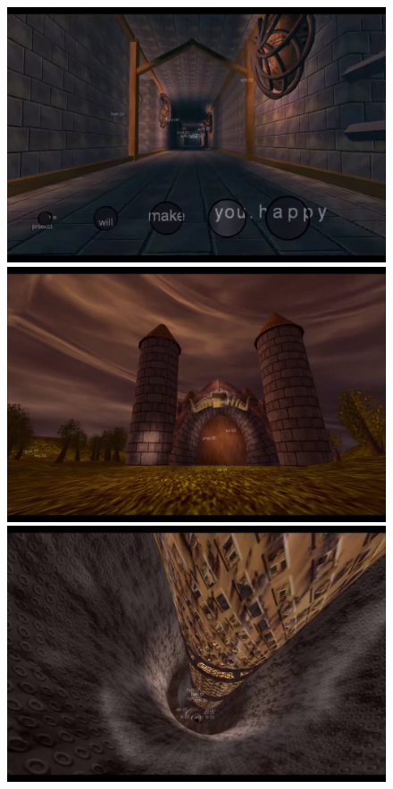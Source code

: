 \begin{figure}[h]
  \begin{minipage}[b]{0.30\linewidth}
    \centering
    \includegraphics[width=\linewidth]{images/demoscene/demos/farb1.png}
  \end{minipage}
  \hfill
  \begin{minipage}[b]{0.30\linewidth}
    \centering
    \includegraphics[width=\linewidth]{images/demoscene/demos/farb2.png}
  \end{minipage}
  \hfill
  \begin{minipage}[b]{0.30\linewidth}
    \centering
    \includegraphics[width=\linewidth]{images/demoscene/demos/farb3.png}

\end{minipage}
\end{figure}
